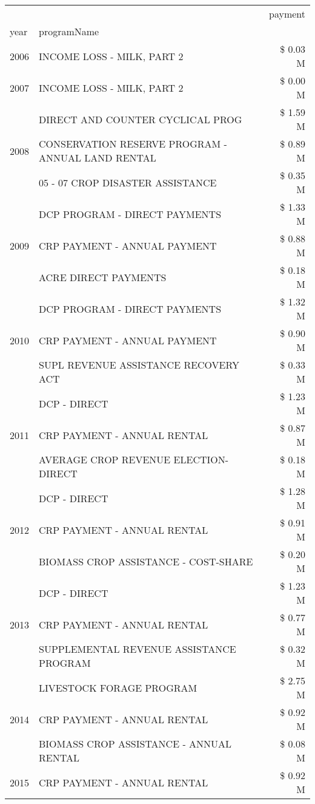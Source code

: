 \begin{tabular}{llr}
\toprule
 &  & payment \\
year & programName &  \\
\midrule
2006 & INCOME LOSS - MILK, PART 2 & \$ 0.03 M \\
\cline{1-3}
2007 & INCOME LOSS - MILK, PART 2 & \$ 0.00 M \\
\cline{1-3}
\multirow[t]{3}{*}{2008} & DIRECT AND COUNTER CYCLICAL PROG & \$ 1.59 M \\
 & CONSERVATION RESERVE PROGRAM - ANNUAL LAND RENTAL & \$ 0.89 M \\
 & 05 - 07 CROP DISASTER ASSISTANCE & \$ 0.35 M \\
\cline{1-3}
\multirow[t]{3}{*}{2009} & DCP PROGRAM - DIRECT PAYMENTS & \$ 1.33 M \\
 & CRP PAYMENT - ANNUAL PAYMENT & \$ 0.88 M \\
 & ACRE DIRECT PAYMENTS & \$ 0.18 M \\
\cline{1-3}
\multirow[t]{3}{*}{2010} & DCP PROGRAM - DIRECT PAYMENTS & \$ 1.32 M \\
 & CRP PAYMENT - ANNUAL PAYMENT & \$ 0.90 M \\
 & SUPL REVENUE ASSISTANCE RECOVERY ACT & \$ 0.33 M \\
\cline{1-3}
\multirow[t]{3}{*}{2011} & DCP - DIRECT & \$ 1.23 M \\
 & CRP PAYMENT - ANNUAL RENTAL & \$ 0.87 M \\
 & AVERAGE CROP REVENUE ELECTION-DIRECT & \$ 0.18 M \\
\cline{1-3}
\multirow[t]{3}{*}{2012} & DCP - DIRECT & \$ 1.28 M \\
 & CRP PAYMENT - ANNUAL RENTAL & \$ 0.91 M \\
 & BIOMASS CROP ASSISTANCE - COST-SHARE & \$ 0.20 M \\
\cline{1-3}
\multirow[t]{3}{*}{2013} & DCP - DIRECT & \$ 1.23 M \\
 & CRP PAYMENT - ANNUAL RENTAL & \$ 0.77 M \\
 & SUPPLEMENTAL REVENUE ASSISTANCE PROGRAM & \$ 0.32 M \\
\cline{1-3}
\multirow[t]{3}{*}{2014} & LIVESTOCK FORAGE PROGRAM & \$ 2.75 M \\
 & CRP PAYMENT - ANNUAL RENTAL & \$ 0.92 M \\
 & BIOMASS CROP ASSISTANCE - ANNUAL RENTAL & \$ 0.08 M \\
\cline{1-3}
\multirow[t]{3}{*}{2015} & CRP PAYMENT - ANNUAL RENTAL & \$ 0.92 M \\

\end{tabular}
